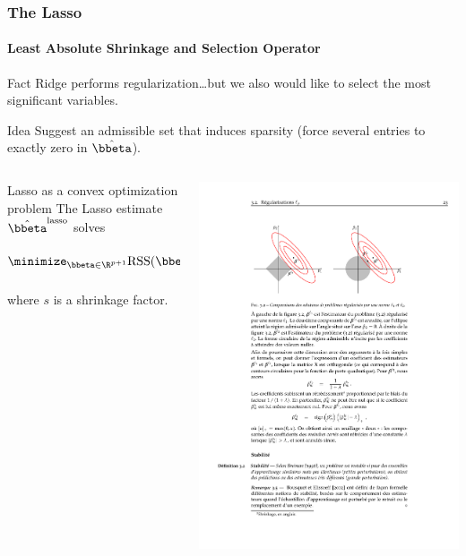 \documentclass{beamer}\usepackage[]{graphicx}\usepackage[]{color}
\begin{document}
\begin{frame}
  \frametitle{The Lasso}
  \framesubtitle{Least Absolute Shrinkage and Selection Operator}

  \begin{block}{Fact}
    Ridge  performs  regularization\dots but  we  also  would like  to
    select the most significant variables.
  \end{block}

  \vfill

  \begin{block}{Idea}
    Suggest  an admissible  set that  induces  \alert{sparsity} (force
    several entries to exactly zero in $\hat{\bbeta}$).
  \end{block}

  \vfill

  \begin{overlayarea}{\textwidth}{.4\textheight}
    \begin{columns}
      \begin{column}[c]{.6\textwidth}
        \begin{block}{Lasso as a convex optimization problem}
          The Lasso estimate $\hat{\bbeta}^{\text{lasso}}$ solves
          \begin{equation*}
            \minimize_{\bbeta\in\R^{p+1}} \mathrm{RSS}(\bbeta), \quad \text{s.t.  }  \sum_{j=1}^p
            \left|\beta_j\right|  \leq s,
          \end{equation*}
          where $s$ is a shrinkage factor.
        \end{block}
      \end{column}
      \begin{column}{.4\textwidth}
        \includegraphics[width=.7\textwidth]{figures/lasso_set}
      \end{column}
    \end{columns}
  \end{overlayarea}

\end{frame}
\end{document}
